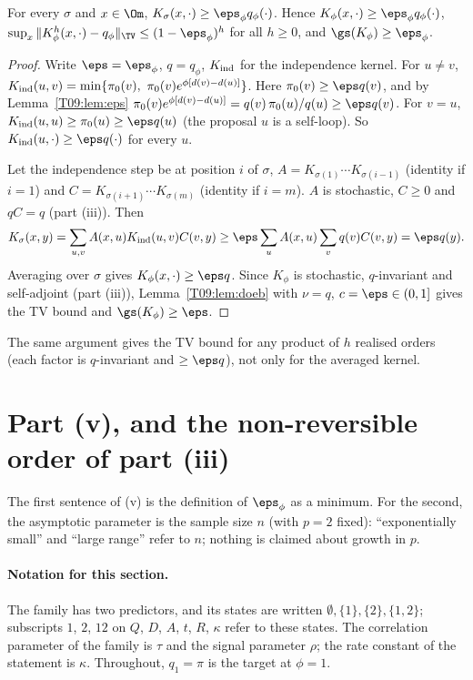 \documentclass[11pt]{report}
\begin{document}
\begin{T09proposition}[Part (iv)]
For every $\sigma$ and $x\in\Om$, $K_\sigma(x,\cdot)\ge\eps_\phi q_\phi(\cdot)$. Hence $K_\phi(x,\cdot)\ge\eps_\phi q_\phi(\cdot)$, $\sup_x\|K_\phi^h(x,\cdot)-q_\phi\|_\TV\le(1-\eps_\phi)^h$ for all $h\ge0$, and $\gs(K_\phi)\ge\eps_\phi$.
\end{T09proposition}
\begin{proof}
Write $\eps=\eps_\phi$, $q=q_\phi$, $K_{\rm ind}$ for the independence kernel. For $u\ne v$,
$K_{\rm ind}(u,v)=\min\{\pi_0(v),\ \pi_0(v)e^{\phi[d(v)-d(u)]}\}$. Here $\pi_0(v)\ge\eps q(v)$, and by Lemma~\ref{T09:lem:eps} $\pi_0(v)e^{\phi[d(v)-d(u)]}=q(v)\,\pi_0(u)/q(u)\ge\eps q(v)$. For $v=u$, $K_{\rm ind}(u,u)\ge\pi_0(u)\ge\eps q(u)$ (the proposal $u$ is a self-loop). So $K_{\rm ind}(u,\cdot)\ge\eps q(\cdot)$ for every $u$.

Let the independence step be at position $i$ of $\sigma$, $A=K_{\sigma(1)}\cdots K_{\sigma(i-1)}$ (identity if $i=1$) and $C=K_{\sigma(i+1)}\cdots K_{\sigma(m)}$ (identity if $i=m$). $A$ is stochastic, $C\ge0$ and $qC=q$ (part (iii)). Then
\[K_\sigma(x,y)=\sum_{u,v}A(x,u)K_{\rm ind}(u,v)C(v,y)\ge\eps\sum_uA(x,u)\sum_vq(v)C(v,y)=\eps q(y).\]
Averaging over $\sigma$ gives $K_\phi(x,\cdot)\ge\eps q$. Since $K_\phi$ is stochastic, $q$-invariant and self-adjoint (part (iii)), Lemma~\ref{T09:lem:doeb} with $\nu=q$, $c=\eps\in(0,1]$ gives the TV bound and $\gs(K_\phi)\ge\eps$.
\end{proof}

\begin{T09remark}
The same argument gives the TV bound for any product of $h$ realised orders (each factor is $q$-invariant and $\ge\eps q$), not only for the averaged kernel.
\end{T09remark}

\section{Part (v), and the non-reversible order of part (iii)}\label{T09:sec:family}

The first sentence of (v) is the definition of $\eps_\phi$ as a minimum. For the second, the asymptotic parameter is the sample size $n$ (with $p=2$ fixed): ``exponentially small'' and ``large range'' refer to $n$; nothing is claimed about growth in $p$.

\paragraph{Notation for this section.} The family has two predictors, and its states are written $\emptyset,\{1\},\{2\},\{1,2\}$; subscripts $1$, $2$, $12$ on $Q$, $D$, $A$, $t$, $R$, $\kappa$ refer to these states. The correlation parameter of the family is $\tau$ and the signal parameter $\rho$; the rate constant of the statement is $\kappa$. Throughout, $q_1=\pi$ is the target at $\phi=1$.
\end{document}
